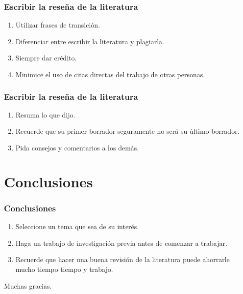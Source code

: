 \documentclass{beamer}
\newcounter{sauvegardeenumi}
\newcommand{\asuivre}{\setcounter{sauvegardeenumi}{\theenumi}}
\newcommand{\suite}{\setcounter{enumi}{\thesauvegardeenumi}}
\begin{document}
    \begin{frame}\frametitle{Escribir la rese\~na de la literatura}
    \begin{multicols}{2}
                \begin{enumerate}
                    \suite
                    \item Utilizar frases de transici\'on.
                    \item Diferenciar entre escribir la literatura y plagiarla.  
                    \item Siempre dar cr\'edito.       
                    \item Minimice el uso de citas directas del trabajo de otras personas.    
                    \asuivre
                \end{enumerate}               
            \end{multicols}
    \end{frame}

    \begin{frame}\frametitle{Escribir la rese\~na de la literatura}
    \begin{multicols}{2}
                \begin{enumerate}
                    \suite
                    \item Resuma lo que dijo.
                    \item Recuerde que su primer borrador seguramente no ser\'a su \'ultimo borrador. 
                    \item Pida consejos y comentarios a los dem\'as.                   
                \end{enumerate}               
            \end{multicols}
    \end{frame}

\section{Conclusiones}
    \begin{frame}\frametitle{Conclusiones}
        \begin{enumerate}                    
            \item Seleccione un tema que sea de su inter\'es.
            \item Haga un trabajo de investigaci\'on previa antes de comenzar a trabajar. 
            \item Recuerde que hacer una buena revisi\'on de la literatura puede ahorrarle mucho tiempo tiempo y trabajo.                   
        \end{enumerate}   
    \end{frame}

    \begin{frame}%
    \begin{center}
    {\fontsize{25}{30}\selectfont Muchas gracias.}
    \end{center}
    \end{frame}
\end{document}
